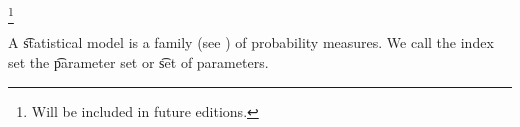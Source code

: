 
\footnote{Will be included in future editions.}


A \t{statistical model} is a family (see ) of probability measures.
We call the index set the \t{parameter set} or \t{set of parameters}.



\blankpage
